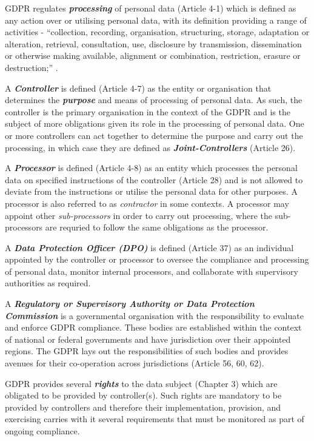 GDPR regulates \textit{\textbf{processing}} of personal data (Article 4-1) which is defined as any action over or utilising personal data, with its definition providing a range of activities - ``collection, recording, organisation, structuring, storage, adaptation or alteration, retrieval, consultation, use, disclosure by transmission, dissemination or otherwise making available, alignment or combination, restriction, erasure or destruction;'' \cite{noauthor_regulation_2016}.

A \textit{\textbf{Controller}} is defined (Article 4-7) as the entity or organisation that determines the \textit{\textbf{purpose}} and means of processing of personal data. As such, the controller is the primary organisation in the context of the GDPR and is the subject of more obligations given its role in the processing of personal data. One or more controllers can act together to determine the purpose and carry out the processing, in which case they are defined as \textit{\textbf{Joint-Controllers}} (Article 26).

A \textit{\textbf{Processor}} is defined (Article 4-8) as an entity which processes the personal data on specified instructions of the controller (Article 28) and is not allowed to deviate from the instructions or utilise the personal data for other purposes. A processor is also referred to as \textit{contractor} in some contexts. A processor may appoint other \textit{sub-processors} in order to carry out processing, where the sub-processors are requried to follow the same obligations as the processor.

A \textit{\textbf{Data Protection Officer (DPO)}} is defined (Article 37) as an individual appointed by the controller or processor to oversee the compliance and processing of personal data, monitor internal processors, and collaborate with supervisory authorities as required.

A \textit{\textbf{Regulatory or Supervisory Authority or Data Protection Commission}} is a governmental organisation with the responsibility to evaluate and enforce GDPR compliance. These bodies are established within the context of national or federal governments and have jurisdiction over their appointed regions. The GDPR lays out the responsibilities of such bodies and provides avenues for their co-operation across jurisdictions (Article 56, 60, 62).

GDPR provides several \textbf{\textit{rights}} to the data subject (Chapter 3) which are obligated to be provided by controller(s). Such rights are mandatory to be provided by controllers and therefore their implementation, provision, and exercising carries with it several requirements that must be monitored as part of ongoing compliance.

